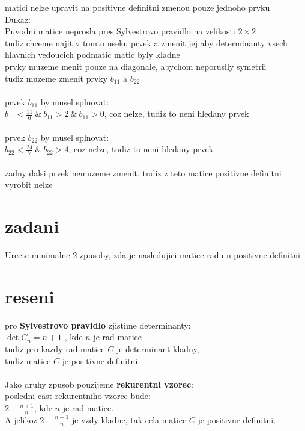 \documentclass[a4paper]{article}
\begin{document}
matici nelze upravit na positivne definitni zmenou pouze jednoho prvku\\
Dukaz:\\
Puvodni matice neprosla pres Sylvestrovo pravidlo na velikosti $2\times2$\\
tudiz chceme najit v tomto useku prvek a zmenit jej
aby determinanty vsech hlavnich vedoucich podmatic matic
byly kladne\\
prvky muzeme menit pouze na diagonale, abychom neporusily symetrii\\
tudiz muzeme zmenit prvky $b_{11}$ a $b_{22}$\\
\\
prvek $b_{11}$ by musel splnovat:\\
$b_{11}<\frac{11}{6} ~\&~ b_{11}>2 ~\&~ b_{11}>0$, coz nelze, tudiz to neni hledany prvek\\
\\
prvek $b_{22}$ by musel splnovat:\\
$b_{22}<\frac{24}{7} ~\&~ b_{22}>4$, coz nelze, tudiz to neni hledany prvek\\
\\
zadny dalsi prvek nemuzeme zmenit, tudiz z teto matice
positivne definitni vyrobit nelze
 









\section*{zadani}
Urcete minimalne 2 zpusoby, zda je nasledujici matice radu n
positivne definitni

\section*{reseni}
pro \textbf{Sylvestrovo pravidlo} zjistime determinanty:\\
$\det C_n = n+1$ , kde $n$ je rad matice\\
tudiz pro kazdy rad matice $C$ je determinant kladny,\\
tudiz matice $C$ je positivne definitni\\
\\
Jako druhy zpusob pouzijeme \textbf{rekurentni vzorec}:\\
posledni cast rekurentniho vzorce bude:\\
$2-\frac{n+1}{n}$, kde $n$ je rad matice.\\
A jelikoz $2-\frac{n+1}{n}$ je vzdy kladne, tak cela matice $C$ je positivne definitni.
\end{document}
